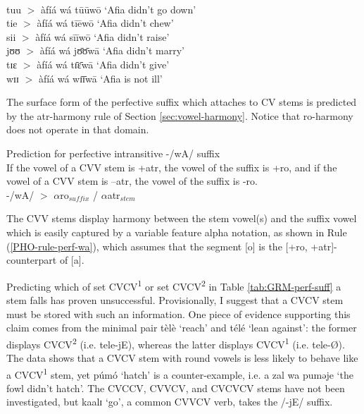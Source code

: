 \begin{exe}
\begin{exe}
\begin{exe}
\begin{exe}
\begin{exe}
\begin{exe}
\begin{exe}
\begin{exe}
\begin{exe}
\begin{exe}
\begin{exe}
\\
tuu $>$ àfíá wá  tūūwō   {\rm `Afia didn't  go down'}\\
tie $>$  àfíá wá   tīēwō {\rm `Afia didn't chew'}\\
sii  $>$  àfíá wá  sīīwō   {\rm  `Afia didn't  raise'}\\
jʊʊ   $>$  àfíá wá  jʊ̄ʊ̄wā  {\rm  `Afia didn't  marry'}\\
tɪɛ $>$  àfíá wá tɪ̄ɛ̄wā  {\rm  `Afia didn't  give'}\\
wɪɪ $>$  àfíá wá  wɪ̄ɪ̄wā  {\rm  `Afia is not  ill'}
 

\z 
 \z

The surface form of the perfective suffix which attaches to CV stems  is 
predicted by the {\sc atr}-harmony rule of Section
\ref{sec:vowel-harmony}. Notice that  {\sc ro}-harmony does not operate
in that domain. 

\begin{Rule}\label{PHO-rule-perf-wa}{Prediction  for perfective intransitive 
-/wA/ suffix}\\
If the vowel of a CVV stem is
{\sc +atr},
the vowel of the suffix is {\sc +ro}, and if the vowel of a CVV stem is {\sc
 --atr}, the vowel of the suffix is {\sc -ro}.\\
-/wA/ $>$  $\alpha${\sc ro}$_{suffix}$  /  $\alpha${\sc atr}$_{stem}$   
\end{Rule}

The CVV stems display  harmony between the stem
vowel(s) and the suffix vowel which is easily captured by a variable feature
alpha notation, as shown in Rule (\ref{PHO-rule-perf-wa}), which  assumes that 
the segment [{\sls o}] is the
[{\sc +ro, +atr}]-counterpart of [{\sls a}]. 




Predicting  which of 
set CVCV\textsuperscript{1} or set CVCV\textsuperscript{2} in Table 
\ref{tab:GRM-perf-suff}  a
stem falls  has proven unsuccessful. Provisionally,  I suggest that a CVCV
stem must be stored with such an information. One piece of evidence
supporting this claim comes from
the minimal pair {\sls tèlè} `reach' and  {\sls télé} `lean against':  the
former displays CVCV\textsuperscript{2} (i.e. tele-jE),  whereas the latter 
displays CVCV\textsuperscript{1}
(i.e. tele-\O).  The data shows that a  CVCV stem with round vowels is less 
likely to
behave like a CVCV\textsuperscript{1} stem, yet {\sls púmó} `hatch' is a 
counter-example, i.e.
{\sls a zal wa puməje} `the fowl didn't hatch'. The CVCCV, CVVCV, and CVCVCV 
stems
have  not been investigated, but {\sls kaalɪ} `go', a common  CVVCV verb, takes
the
/-jE/ suffix.  



\end{exe}
\end{exe}
\end{exe}
\end{exe}
\end{exe}
\end{exe}
\end{exe}
\end{exe}
\end{exe}
\end{exe}
\end{exe}

